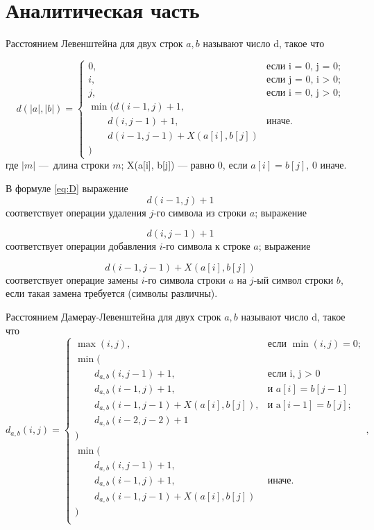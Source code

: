 \chapter{Аналитическая часть}

Расстоянием Левенштейна для двух строк $a, b$ называют число d, такое что

\begin{equation}
	\label{eq:D}
	d(|a|, |b|) = \begin{cases}
		
		0, &\text{если i = 0, j = 0;}\\
		i, &\text{если j = 0, i > 0;}\\
		j, &\text{если i = 0, j > 0;}\\
		\min  (d(i-1, j) + 1 ,\\
		\qquad d(i, j-1) + 1 ,&\text{иначе.}\\
		\qquad d(i-1, j-1) + X(a[i], b[j]) \\
		)
	\end{cases}
\end{equation}
где $|m|$ — длина строки $m$; X(a[i], b[j]) — равно 0, если $a[i] = b[j]$, 0 иначе.

В формуле \ref{eq:D} выражение
\begin{equation}
	\label{eq:delete}
	d(i-1, j) + 1
\end{equation}
соответствует операции удаления $j$-го символа из строки $a$; выражение

\begin{equation}
	\label{eq:delete}
	d(i, j-1) + 1
\end{equation}
соответствует операции добавления $i$-го символа к строке $a$; выражение

\begin{equation}
	\label{eq:delete}
	d(i-1, j-1) + X(a[i], b[j])
\end{equation}
соответствует операцие замены $i$-го символа строки $a$ на $j$-ый символ строки $b$, если такая замена требуется (символы различны).


\pagebreak
Расстоянием Дамерау-Левенштейна для двух строк $a, b$ называют число d, такое что
\begin{equation}
	\label{eq:d}
	d_{a,b}(i, j) = \begin{cases}
		\max(i, j), &\text{если }\min(i, j) = 0;\\
		\min ( \\
		\qquad d_{a,b}(i, j-1) + 1,&\text{если i, j > 0}\\
		\qquad d_{a,b}(i-1, j) + 1, &\text{и $a[i]=b[j-1]$}\\
		\qquad d_{a,b}(i-1, j-1) + X(a[i], b[j]), &\text{и a$[i-1]=b[j]$;}\\
		\qquad d_{a,b}(i-2, j-2) + 1 \\
		) \\
		\min (\\
		\qquad d_{a,b}(i, j-1) + 1,\\
		\qquad d_{a,b}(i-1, j) + 1,&\text{иначе.}\\
		\qquad d_{a,b}(i-1, j-1) + X(a[i], b[j]) \\
		) \\
	\end{cases},
\end{equation}

